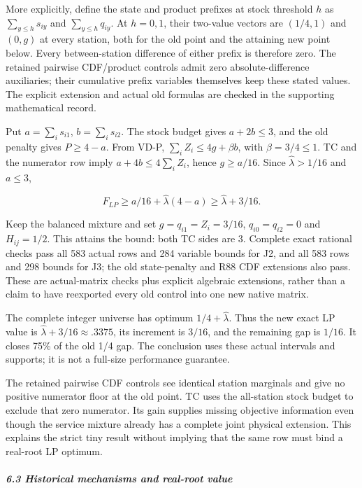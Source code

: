 \documentclass[
  american,
  11pt,
]{article}
\begin{document}
More explicitly, define the state and product prefixes at stock
threshold \(h\) as \(\sum_{y\le h}s_{iy}\) and \(\sum_{y\le h}q_{iy}\).
At \(h=0,1\), their two-value vectors are \((1/4,1)\) and \((0,g)\) at
every station, both for the old point and the attaining new point below.
Every between-station difference of either prefix is therefore zero. The
retained pairwise CDF/product controls admit zero absolute-difference
auxiliaries; their cumulative prefix variables themselves keep these
stated values. The explicit extension and actual old formulas are
checked in the supporting mathematical record.

Put \(a=\sum_i s_{i1}\), \(b=\sum_i s_{i2}\). The stock budget gives
\(a+2b\le3\), and the old penalty gives \(P\ge4-a\). From VD-P,
\(\sum_iZ_i\le4g+\beta b\), with \(\beta=3/4\le1\). TC and the numerator
row imply \(a+4b\le4\sum_i Z_i\), hence \(g\ge a/16\). Since
\(\widehat\lambda>1/16\) and \(a\le3\),

\[
F_{LP}\ge a/16+\widehat\lambda(4-a)\ge\widehat\lambda+3/16.
\]

Keep the balanced mixture and set \(g=q_{i1}=Z_i=3/16\),
\(q_{i0}=q_{i2}=0\) and \(H_{ij}=1/2\). This attains the bound: both TC
sides are 3. Complete exact rational checks pass all 583 actual rows and
284 variable bounds for J2, and all 583 rows and 298 bounds for J3; the
old state-penalty and R88 CDF extensions also pass. These are
actual-matrix checks plus explicit algebraic extensions, rather than a
claim to have reexported every old control into one new native matrix.

The complete integer universe has optimum \(1/4+\widehat\lambda\). Thus
the new exact LP value is \(\widehat\lambda+3/16\approx.3375\), its
increment is \(3/16\), and the remaining gap is \(1/16\). It closes 75\%
of the old 1/4 gap. The conclusion uses these actual intervals and
supports; it is not a full-size performance guarantee.

The retained pairwise CDF controls see identical station marginals and
give no positive numerator floor at the old point. TC uses the
all-station stock budget to exclude that zero numerator. Its gain
supplies missing objective information even though the service mixture
already has a complete joint physical extension. This explains the
strict tiny result without implying that the same row must bind a
real-root LP optimum.

\subparagraph{6.3 Historical mechanisms and real-root
value}\label{historical-mechanisms-and-real-root-value}
\end{document}
